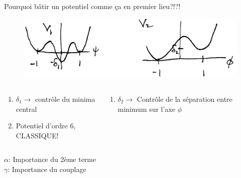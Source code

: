 \documentclass[handout]{beamer}
\begin{document}
\begin{frame}
Pourquoi bâtir un potentiel comme ça en premier lieu?!?!\\
\begin{figure}[0.3\textwidth]
    \includegraphics[scale=0.25]{psi_phi.png}
    \end{figure}
\begin{columns}[T]
    \begin{column}[T]{.5\linewidth}
    \begin{enumerate}
    \item $\delta_1 \rightarrow$ contrôle du minima central
    \item Potentiel d'ordre 6, CLASSIQUE! 
    \end{enumerate}
   
    \end{column}
    \begin{column}[T]{.5\linewidth}
    \begin{enumerate}
    \item    $\delta_2 \rightarrow$ Contrôle de la séparation entre minimum sur l'axe $\phi$
    \end{enumerate}

    \end{column}
  \end{columns}
  
 $\alpha$: Importance du 2ème terme \\
 $\gamma$: Importance du couplage \\
\end{frame}
\end{document}
